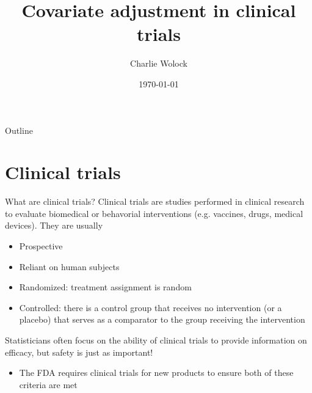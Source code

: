 \documentclass[10pt,t]{beamer}
\title{Covariate adjustment in clinical trials}
\author{Charlie Wolock}
\date{\today}
\begin{document}
\begin{frame}
	\titlepage 
\end{frame}


\begin{frame}{Outline}
	\tableofcontents
\end{frame}



\section{Clinical trials}

\begin{frame}{What are clinical trials?}
	Clinical trials are studies performed in clinical research to evaluate biomedical or behavorial interventions (e.g. vaccines, drugs, medical devices). They are usually
	\begin{itemize}
		\item Prospective
		\item Reliant on human subjects
		\item Randomized: treatment assignment is random
		\item Controlled: there is a control group that receives no intervention (or a placebo) that serves as a comparator to the group receiving the intervention 
	\end{itemize}
	Statisticians often focus on the ability of clinical trials to provide information on efficacy, but safety is just as important!
	\begin{itemize}
		\item The FDA requires clinical trials for new products to ensure both of these criteria are met
	\end{itemize}
\end{frame}
\end{document}
